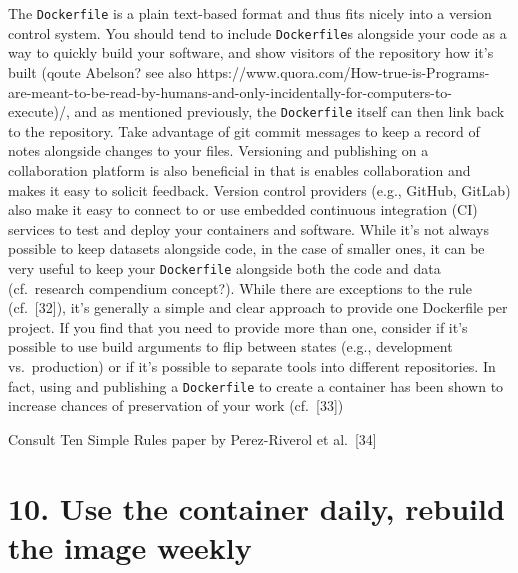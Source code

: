 \documentclass[10pt,letterpaper]{article}
\begin{document}
The \texttt{Dockerfile} is a plain text-based format and thus fits
nicely into a version control system. You should tend to include
\texttt{Dockerfile}s alongside your code as a way to quickly build your
software, and show visitors of the repository how it's built (qoute
Abelson? see also
https://www.quora.com/How-true-is-Programs-are-meant-to-be-read-by-humans-and-only-incidentally-for-computers-to-execute)/,
and as mentioned previously, the \texttt{Dockerfile} itself can then
link back to the repository. Take advantage of git commit messages to
keep a record of notes alongside changes to your files. Versioning and
publishing on a collaboration platform is also beneficial in that is
enables collaboration and makes it easy to solicit feedback. Version
control providers (e.g., GitHub, GitLab) also make it easy to connect to
or use embedded continuous integration (CI) services to test and deploy
your containers and software. While it's not always possible to keep
datasets alongside code, in the case of smaller ones, it can be very
useful to keep your \texttt{Dockerfile} alongside both the code and data
(cf.~research compendium concept?). While there are exceptions to the
rule (cf.~{[}32{]}), it's generally a simple and clear approach to
provide one Dockerfile per project. If you find that you need to provide
more than one, consider if it's possible to use build arguments to flip
between states (e.g., development vs.~production) or if it's possible to
separate tools into different repositories. In fact, using and
publishing a \texttt{Dockerfile} to create a container has been shown to
increase chances of preservation of your work (cf.~{[}33{]})

Consult Ten Simple Rules paper by Perez-Riverol et al.~{[}34{]}

\hypertarget{use-the-container-daily-rebuild-the-image-weekly}{%
\section*{10. Use the container daily, rebuild the image
weekly}\label{use-the-container-daily-rebuild-the-image-weekly}}
\end{document}
